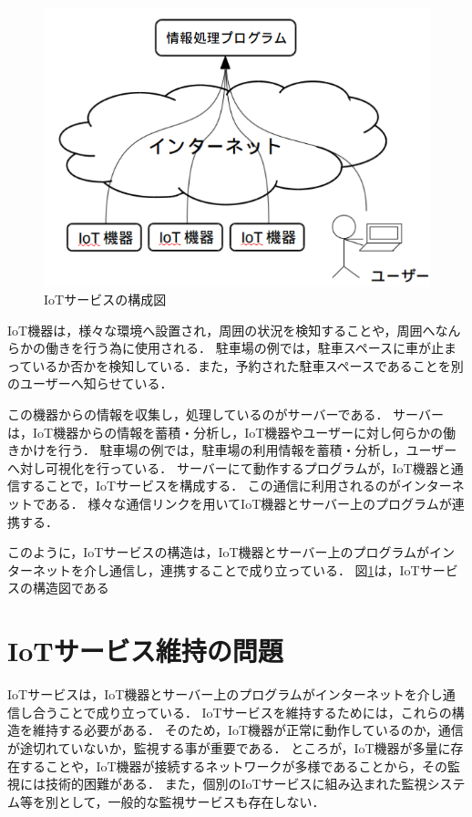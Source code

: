 \begin{figure}[htbp]
\includegraphics[width=14cm]{images/IoTservice.png}
\caption{IoTサービスの構成図}
\label{fig:IoTservice}
\end{figure}

IoT機器は，様々な環境へ設置され，周囲の状況を検知することや，周囲へなんらかの働きを行う為に使用される．
駐車場の例では，駐車スペースに車が止まっているか否かを検知している．また，予約された駐車スペースであることを別のユーザーへ知らせている．
\medskip

この機器からの情報を収集し，処理しているのがサーバーである．
サーバーは，IoT機器からの情報を蓄積・分析し，IoT機器やユーザーに対し何らかの働きかけを行う．
駐車場の例では，駐車場の利用情報を蓄積・分析し，ユーザーへ対し可視化を行っている．
サーバーにて動作するプログラムが，IoT機器と通信することで，IoTサービスを構成する．
この通信に利用されるのがインターネットである．
様々な通信リンクを用いてIoT機器とサーバー上のプログラムが連携する．
\medskip

このように，IoTサービスの構造は，IoT機器とサーバー上のプログラムがインターネットを介し通信し，連携することで成り立っている．
図\ref{fig:IoTservice}は，IoTサービスの構造図である

\section{IoTサービス維持の問題}
IoTサービスは，IoT機器とサーバー上のプログラムがインターネットを介し通信し合うことで成り立っている．
IoTサービスを維持するためには，これらの構造を維持する必要がある．
そのため，IoT機器が正常に動作しているのか，通信が途切れていないか，監視する事が重要である．
ところが，IoT機器が多量に存在することや，IoT機器が接続するネットワークが多様であることから，その監視には技術的困難がある．
また，個別のIoTサービスに組み込まれた監視システム等を別として，一般的な監視サービスも存在しない．
\medskip


